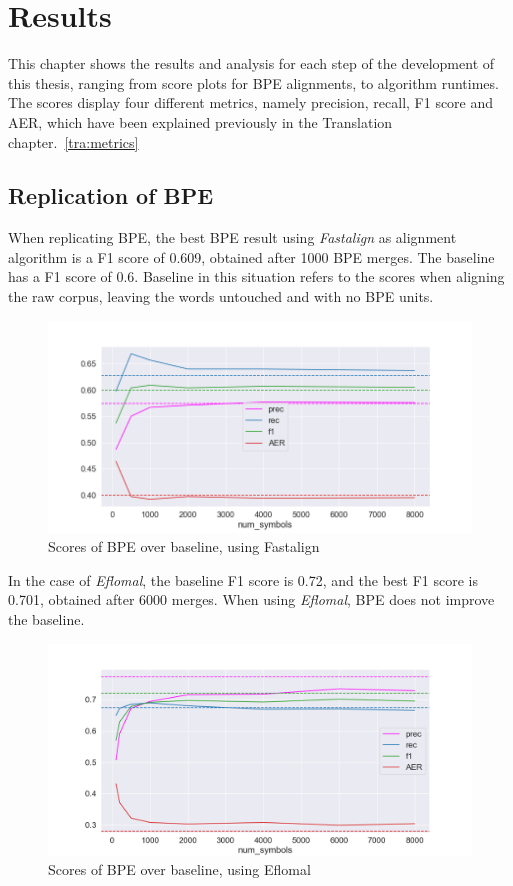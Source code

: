 %
%

\chapter{Results}\label{ch:results}

This chapter shows the results and analysis for each step of the development of this thesis, ranging from score plots for BPE alignments, to algorithm runtimes. The scores display four different metrics, namely precision, recall, F1 score and AER, which have been explained previously in the Translation chapter.~\ref{tra:metrics}

\section{Replication of BPE}

When replicating BPE, the best BPE result using \emph{Fastalign} as alignment algorithm is a F1 score of 0.609, obtained after 1000 BPE merges. The baseline has a F1 score of 0.6. Baseline in this situation refers to the scores when aligning the raw corpus, leaving the words untouched and with no BPE units.

\begin{figure}[!ht]
    \centering
    \includegraphics[width=13cm]{../reports/scores_normal_bpe/eng_deu_fastalign.png}
    \caption{Scores of BPE over baseline, using Fastalign}
\end{figure}

In the case of \emph{Eflomal}, the baseline F1 score is 0.72, and the best F1 score is 0.701, obtained after 6000 merges. When using \emph{Eflomal}, BPE does not improve the baseline.

\begin{figure}[!ht]
    \centering
    \includegraphics[width=13cm]{../reports/scores_normal_bpe/eng_deu_eflomal.png}
    \caption{Scores of BPE over baseline, using Eflomal}
\end{figure}

